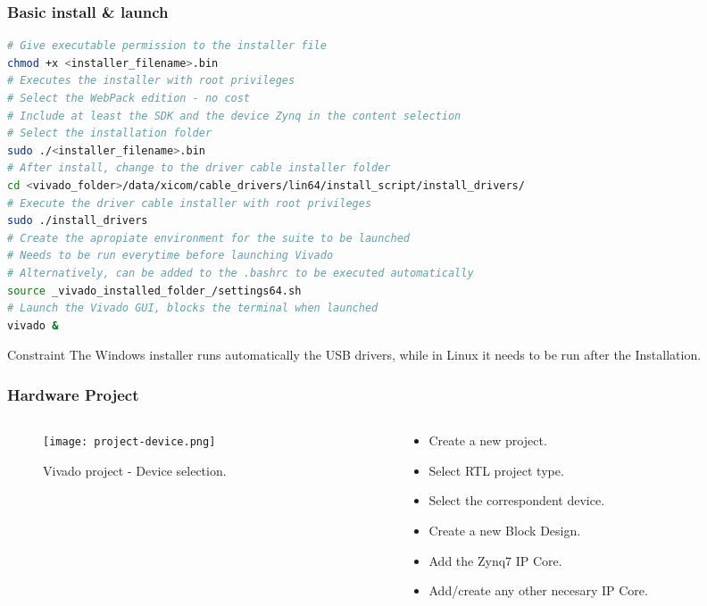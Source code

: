 \begin{frame}[fragile]
	\frametitle{Basic install \& launch}
	\begin{lstlisting}[language=bash, basicstyle=\tiny\ttfamily, tabsize=2, commentstyle=\color{darkgray}, keywordstyle=\color{blue}, backgroundcolor=\color{lightgray}, morekeywords={chmod, sudo}, breaklines=true]
# Give executable permission to the installer file
chmod +x <installer_filename>.bin
# Executes the installer with root privileges
# Select the WebPack edition - no cost
# Include at least the SDK and the device Zynq in the content selection
# Select the installation folder
sudo ./<installer_filename>.bin
# After install, change to the driver cable installer folder
cd <vivado_folder>/data/xicom/cable_drivers/lin64/install_script/install_drivers/
# Execute the driver cable installer with root privileges
sudo ./install_drivers
# Create the apropiate environment for the suite to be launched
# Needs to be run everytime before launching Vivado
# Alternatively, can be added to the .bashrc to be executed automatically
source _vivado_installed_folder_/settings64.sh
# Launch the Vivado GUI, blocks the terminal when launched
vivado &
	\end{lstlisting}
	\begin{alertblock}{Constraint}
		{\small The Windows installer runs automatically the USB drivers, while in Linux it needs to be run after the Installation.}
	\end{alertblock}
\end{frame}

\begin{frame}
	\frametitle{Hardware Project}
	\begin{columns}
		\begin{column}{0.5\textwidth}
			\begin{figure}
				\texttt{[image: project-device.png]}
				\caption{Vivado project - Device selection.}\label{fig:project-device}
			\end{figure}
		\end{column}
		\begin{column}{0.5\textwidth}
			\begin{itemize}
				\item Create a new project.
				\item Select RTL project type.
				\item Select the correspondent device.
				\item Create a new Block Design.
				\item Add the Zynq7 IP Core.
				\item Add/create any other necesary IP Core.
			\end{itemize}
		\end{column}
	\end{columns}
\end{frame}


